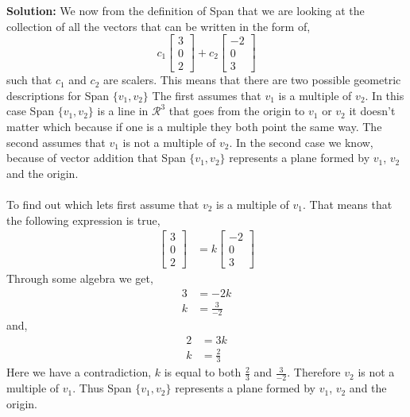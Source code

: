\documentclass{amsart}
\begin{document}
\noindent \textbf{Solution: }
We now from the definition of Span that we are looking at the collection of all the vectors that can be written in the form of,
\begin{equation}
c_1\begin{bmatrix} 
3\\
0\\
2
\end{bmatrix}
+c_2
\begin{bmatrix} 
-2\\
0\\
3
\end{bmatrix}
\end{equation}
such that $c_1$ and $c_2$ are scalers. This means that there are two possible geometric descriptions for Span $\{v_{1},v_{2}\}$ The first assumes that $v_{1}$ is a multiple of $v_{2}$. In this case Span $\{v_{1},v_{2}\}$ is a line in $\mathcal{R}^3$ that goes from the origin to $v_1$ or $v_2$ it doesn't matter which because if one is a multiple they both point the same way. The second assumes that $v_{1}$ is not a multiple of $v_{2}$. In the second case we know, because of vector addition that Span $\{v_{1},v_{2}\}$ represents a plane formed by $v_{1}$, $v_{2}$ and the origin.\\\\
To find out which lets first assume that $v_{2}$ is a multiple of $v_{1}$. That means that the following expression is true,
\begin{align}
\begin{bmatrix} 
3\\
0\\
2
\end{bmatrix}
&=k
\begin{bmatrix} 
-2\\
0\\
3
\end{bmatrix}
\end{align}
Through some algebra we get,
\begin{align}
3&=-2k\\
k&=\frac{3}{-2}
\end{align}
and,
\begin{align}
2&=3k\\
k&=\frac{2}{3}
\end{align}
Here we have a contradiction, $k$ is equal to both $\frac{2}{3}$ and $\frac{3}{-2}$. Therefore $v_{2}$ is not a multiple of $v_{1}$. Thus Span $\{v_{1},v_{2}\}$ represents a plane formed by $v_{1}$, $v_{2}$ and the origin.
\end{document}
